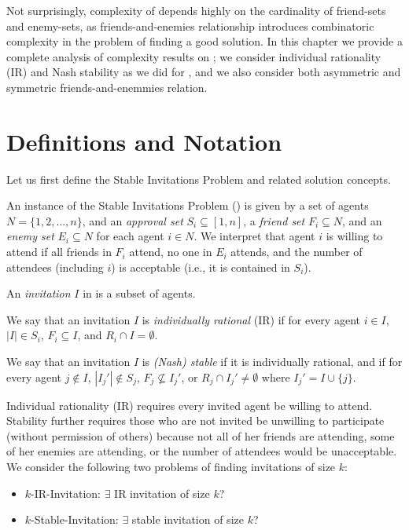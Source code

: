 Not surprisingly, complexity of \SIPs depends highly on the cardinality of friend-sets and enemy-sets, as friends-and-enemies relationship introduces combinatoric complexity in the problem of finding a good solution. 
In this chapter we provide a complete analysis of complexity results on \SIP; we consider individual rationality (IR) and Nash stability as we did for \GASP, and we also consider both asymmetric and symmetric friends-and-enemmies relation. 


\section{Definitions and Notation} \label{SIP:sec:SIP:prelim}

Let us first define the Stable Invitations Problem and related solution concepts. 

\begin{definition} \label{SIP:def:instance}
An instance of the Stable Invitations Problem (\SIP) is given by a set of agents $N = \{1, 2, \dots, n\}$, and an {\em approval set} $S_i \subseteq [1,n]$, a {\em friend set} $F_i \subseteq N$, and an {\em enemy set} $E_i \subseteq N$ for each agent $i\in N$.
We interpret that agent $i$ is willing to attend if all friends in $F_i$ attend, no one in $E_i$ attends, and the number of attendees (including $i$) is acceptable (i.e., it is contained in $S_i$).
\end{definition}

\begin{definition} 
An {\em invitation} $I$ in \SIPs is a subset of agents.

	We say that an invitation $I$ is {\em individually rational} (IR) if for every agent $i\in I$, $|I| \in S_i$, $F_i \subseteq I$, and $R_i \cap I = \emptyset$.
	
	We say that an invitation $I$ is {\em (Nash) stable} if it is individually rational, and if for every agent $j \not\in I$, $|I_j'| \not\in S_j$, $F_j \not\subseteq I_j'$, or $R_j \cap I_j' \neq \emptyset$ where $I_j' = I \cup \{j\}$.
\end{definition}

Individual rationality (IR) requires every invited agent be willing to attend.
Stability further requires those who are not invited be unwilling to participate (without permission of others)
because not all of her friends are attending, some of her enemies are attending, or the number of attendees would be unacceptable. 
We consider the following two problems of finding invitations of size $k$:
\begin{itemize}
	\item $k$-IR-Invitation: $\exists$ IR invitation of size $k$?
	\item $k$-Stable-Invitation: $\exists$ stable invitation of size $k$?
\end{itemize}

